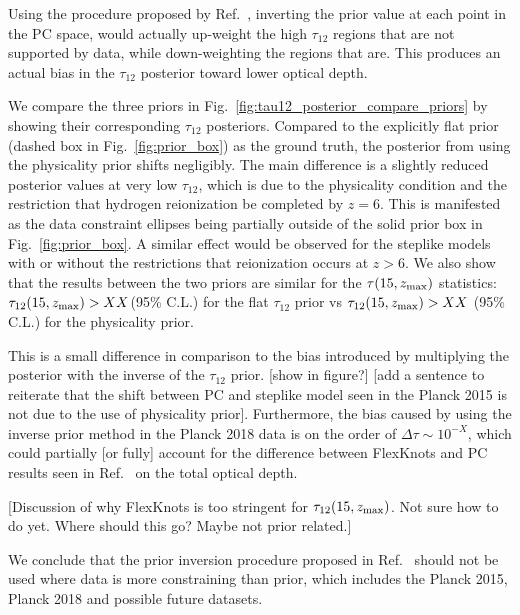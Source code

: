 \documentclass[prd,twocolumn,amsmath,amssymb,floatfix,superscriptaddress,nofootinbib]{revtex4-1}
\newcommand{\zmax}{z_{\rm max}}
\begin{document}
Using the procedure proposed by Ref.~\cite{Millea:2018bko}, inverting the prior value at each point in the PC space, would actually up-weight the high $\tau_{12}$ regions that are not supported by data, while down-weighting the regions that are. This produces an actual bias in the $\tau_{12}$ posterior toward lower optical depth.

We compare the three priors in Fig.~\ref{fig:tau12_posterior_compare_priors} by showing their corresponding $\tau_{12}$ posteriors. Compared to the explicitly flat prior (dashed box in Fig.~\ref{fig:prior_box}) as the ground truth, the posterior from using the physicality prior shifts negligibly. The main difference is a slightly reduced posterior values at very low $\tau_{12}$, which is due to the physicality condition and the restriction that hydrogen reionization be completed by $z = 6$. This is manifested as the data constraint ellipses being partially outside of the solid prior box in Fig.~\ref{fig:prior_box}. A similar effect would be observed for the steplike models with or without the  restrictions that reionization occurs at $z>6$. We also show that the results between the two priors are similar for the $\tau(15, \zmax)$ statistics: $\tau_{12}(15, \zmax) > XX $(95\% C.L.) for the flat $\tau_{12}$ prior vs $\tau_{12}(15, \zmax) > XX $ (95\% C.L.) for the physicality prior.

This is a small difference in comparison to the bias introduced by multiplying the posterior with the inverse of the $\tau_{12}$ prior. [show in figure?] [add a sentence to reiterate that the shift between PC and steplike model seen in the Planck 2015 is not due to the use of physicality prior]. Furthermore, the bias caused by using the inverse prior method in the Planck 2018 data is on the order of $\Delta \tau \sim 10^{-X}$, which could partially [or fully] account for the difference between FlexKnots and PC results seen in Ref.~\cite{Aghanim:2018eyx} on the total optical depth. 

[Discussion of why FlexKnots is too stringent for $\tau_{12}(15, \zmax)$. Not sure how to do yet. Where should this go? Maybe not prior related.]

We conclude that the prior inversion procedure proposed in Ref.~\cite{Millea:2018bko} should not be used where data is more constraining than prior, which includes the Planck 2015, Planck 2018 and possible future datasets.  
\end{document}
